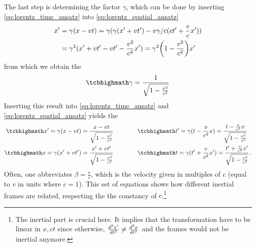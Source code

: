 The last step is determining the factor $\gamma$, which can be done by inserting \eqref{eq:lorentz_time_ansatz} into \eqref{eq:lorentz_spatial_ansatz}
\begin{align*}
	x' &= \gamma (x - vt) = \gamma (\gamma (x' + vt') - v \gamma / c (ct' + \frac{v}{c} x'))
	\\
	&= \gamma^2 (x' + vt' - vt' - \frac{v^2}{c^2} x') = \gamma^2 \qty(1 - \frac{v^2}{c^2}) x'
\end{align*}
from which we obtain the 
\begin{equation}\label{eq:gamma_factor}
	\eqbox{
	\gamma = \frac{1}{\sqrt{1 - \frac{v^2}{c^2}}}
	}
\end{equation}
Inserting this result into \eqref{eq:lorentz_time_ansatz} and \eqref{eq:lorentz_spatial_ansatz} yields the 
\begin{subequations}\label{eq:lorentz_trafo}
%
%
\begin{align}
	\eqbox{
	x' = \gamma (x - vt) = \frac{x - vt}{\sqrt{1 - \frac{v^2}{c^2}}}
	}
	\qquad & \qquad
	\eqbox{
	t' = \gamma (t - \frac{v}{c^2} x) = \frac{t - \frac{v}{c^2} x}{\sqrt{1 - \frac{v^2}{c^2}}}
	}
	\\
	\eqbox{
	x = \gamma (x' + vt') = \frac{x' + vt'}{\sqrt{1 - \frac{v^2}{c^2}}}
	}
	\qquad & \qquad
	\eqbox{
	t = \gamma (t' + \frac{v}{c^2} x') = \frac{t' + \frac{v}{c^2} x'}{\sqrt{1 - \frac{v^2}{c^2}}}
	} \, .
\end{align}
\end{subequations}
Often, one abbreviates $\beta = \frac{v}{c}$, which is the velocity given in multiples of $c$ (equal to $v$ in units where $c = 1$). This set of equations shows how different inertial frames are related, respecting the the constancy of $c$.\footnote{The inertial part is crucial here. It implies that the transformation have to be linear in $x, ct$ since otherwise, $\dv[2]{x'}{t} \neq \dv[2]{x}{t}$ and the frames would not be inertial anymore.}\\


